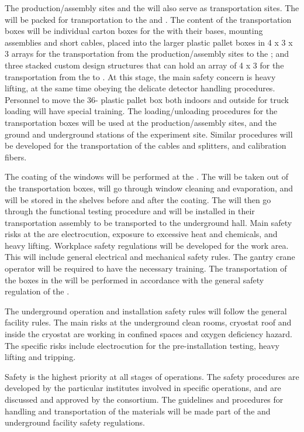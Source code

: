 The production/assembly sites and the  will also serve as transportation sites. The  will be packed for transportation to the  and \surf. The content of the transportation boxes will be individual carton boxes for the  with their bases, mounting assemblies and short cables, placed into the larger plastic pallet boxes in \num{4} x \num{3} x \num{3} arrays for the transportation from the production/assembly sites to the ; and three stacked custom design structures that can hold an array of \num{4} x \num{3}  for the transportation from the  to \surf. At this stage, the main safety concern is heavy lifting, at the same time obeying the delicate detector handling procedures. Personnel to move the \num{36}- plastic pallet box both indoors and outside for truck loading will have special training. The loading/unloading procedures for the  transportation boxes will be used at the production/assembly sites,  and the ground and underground stations of the experiment site. Similar procedures will be developed for the transportation of the  cables and splitters, and calibration fibers.

The  coating of the  windows will be performed at the . The  will be taken out of the transportation boxes, will go through window cleaning and  evaporation, and will be stored in the shelves before and after the coating. The  will then go through the functional testing procedure and will be installed in their transportation assembly to be transported to the underground hall. Main safety risks at the  are electrocution, exposure to excessive heat and chemicals, and heavy lifting. Workplace safety regulations will be developed for the  \dual {} work area. This will include general electrical and mechanical safety rules. The gantry crane operator will be required to have the necessary training. The transportation of the  boxes in the  will be performed in accordance with the general safety regulation of the .

The underground operation and installation safety rules will follow the general facility rules. The main risks at the underground clean rooms, cryostat roof and inside the cryostat are working in confined spaces and oxygen deficiency hazard. The \dual {} specific risks include electrocution for the pre-installation testing, heavy lifting and tripping.

Safety is the highest priority at all stages of \dual {} operations. The safety procedures are developed by the particular institutes involved in specific operations, and are discussed and approved by the consortium. The guidelines and procedures for handling and transportation of the \dual {} materials will be made part of the  and underground facility safety regulations.








